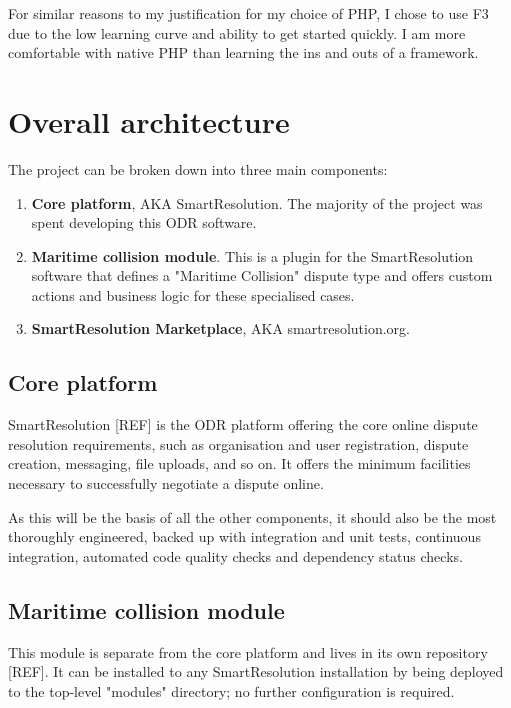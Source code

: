 For similar reasons to my justification for my choice of PHP, I chose to use F3 due to the low learning curve and ability to get started quickly. I am more comfortable with native PHP than learning the ins and outs of a framework.

\section{Overall architecture}

The project can be broken down into three main components:

\begin{enumerate}
    \item \textbf{Core platform}, AKA SmartResolution. The majority of the project was spent developing this ODR software.
    
    \item \textbf{Maritime collision module}. This is a plugin for the SmartResolution software that defines a "Maritime Collision" dispute type and offers custom actions and business logic for these specialised cases.
    
    \item \textbf{SmartResolution Marketplace}, AKA smartresolution.org. 
\end{enumerate}

\subsection{Core platform}

SmartResolution [REF] is the ODR platform offering the core online dispute resolution requirements, such as organisation and user registration, dispute creation, messaging, file uploads, and so on. It offers the minimum facilities necessary to successfully negotiate a dispute online.

As this will be the basis of all the other components, it should also be the most thoroughly engineered, backed up with integration and unit tests, continuous integration, automated code quality checks and dependency status checks.

\subsection{Maritime collision module}

This module is separate from the core platform and lives in its own repository [REF]. It can be installed to any SmartResolution installation by being deployed to the top-level "modules" directory; no further configuration is required.

